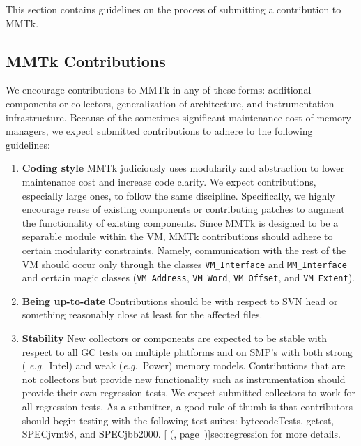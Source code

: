 This section contains guidelines on the process of
submitting a contribution to MMTk.


\subsection{MMTk Contributions}

We encourage contributions to MMTk in any of these forms: additional
components or collectors, generalization of architecture,
and instrumentation infrastructure.  Because of the sometimes significant
maintenance cost of memory managers, we expect submitted contributions
to adhere to the following guidelines:


\begin{enumerate}

\item {\bf Coding style}  
MMTk judiciously uses modularity and abstraction to lower maintenance
cost and increase code clarity.  We expect contributions, especially
large ones, to follow the same discipline.  Specifically, we highly
encourage reuse of existing components or contributing patches to
augment the functionality of existing components.  Since MMTk is
designed to be a separable module within the VM, MMTk contributions
should adhere to certain modularity constraints.  Namely,
communication with the rest of the VM should occur only through the
classes {\tt VM\_Interface} and {\tt MM\_Interface} and certain magic classes
({\tt VM\_Address}, {\tt VM\_Word}, {\tt VM\_Offset}, and {\tt VM\_Extent}).

\item {\bf Being up-to-date}  
Contributions should be with respect to SVN head or something
reasonably close at least for the affected files.

\item { \bf Stability}  
New collectors or components are expected to be stable with respect to
all GC tests on multiple platforms and on SMP's with both strong ({\it
e.g.}\ Intel\Rweb{}) and weak ({\it e.g.}\ Power) memory models.  Contributions
that are not collectors but provide new functionality such as
instrumentation should provide their own regression tests.
We expect submitted collectors to work for all regression tests.
As a submitter, a good rule of thumb is that contributors should begin
testing with the following test suites: bytecodeTests, gctest, 
SPECjvm\Rweb{}98, and SPECjbb\Rweb{}2000.  [ (\Ref,
page~\Pageref)]{sec:regression} for more details. 


\end{enumerate}
